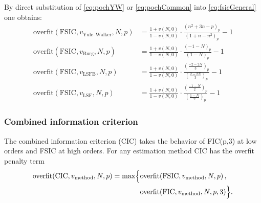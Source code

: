 \documentclass[12pt,letterpaper]{article}
\newcommand{\Pochhammer}[2]{\left(#1\right)_{#2}}
\begin{document}
By direct substitution of \eqref{eq:pochYW} or \eqref{eq:pochCommon} into
\eqref{eq:fsicGeneral} one obtains:
\begin{align}
    \text{overfit}\!\left(\text{FSIC},v_\text{Yule--Walker},N,p\right)
    &=
    \frac{
        1 + v\!\left(N,0\right)
    }{
        1 - v\!\left(N,0\right)
    }
    \cdot
    \frac{
        \Pochhammer{n^2+3n-p}{p}
    }{
        \Pochhammer{1+n-n^2}{p}
    }
    - 1
    \\
    \text{overfit}\!\left(\text{FSIC},v_\text{Burg},N,p\right)
    &=
    \frac{
        1 + v\!\left(N,0\right)
    }{
        1 - v\!\left(N,0\right)
    }
    \cdot
    \frac{
        \Pochhammer{-1-N}{p}
    }{
        \Pochhammer{1-N}{p}
    }
    - 1
    \\
    \text{overfit}\!\left(\text{FSIC},v_\text{LSFB},N,p\right)
    &=
    \frac{
        1 + v\!\left(N,0\right)
    }{
        1 - v\!\left(N,0\right)
    }
    \cdot
    \frac{
        \Pochhammer{\frac{-2-2N}{3}}{p}
    }{
        \Pochhammer{\frac{2-2N}{3}}{p}
    }
    - 1
    \\
    \text{overfit}\!\left(\text{FSIC},v_\text{LSF},N,p\right)
    &=
    \frac{
        1 + v\!\left(N,0\right)
    }{
        1 - v\!\left(N,0\right)
    }
    \cdot
    \frac{
        \Pochhammer{\frac{-1-N}{2}}{p}
    }{
        \Pochhammer{\frac{1-N}{2}}{p}
    }
    - 1
\end{align}

\subsubsection*{Combined information criterion}

The combined information criterion (CIC) takes the behavior of FIC(p,3) at low
orders and FSIC at high orders.  For any estimation method CIC has the
overfit penalty term
\begin{align}
    \text{overfit}\!\left(\text{CIC},v_\text{method},N,p\right)
    =
    \max\Bigl\{
        &\text{overfit}\!\left(\text{FSIC},v_\text{method},N,p\right),
\\
        &\text{overfit}\!\left(\text{FIC},v_\text{method},N,p,3\right)
    \Bigr\}
    .
\end{align}
\end{document}
